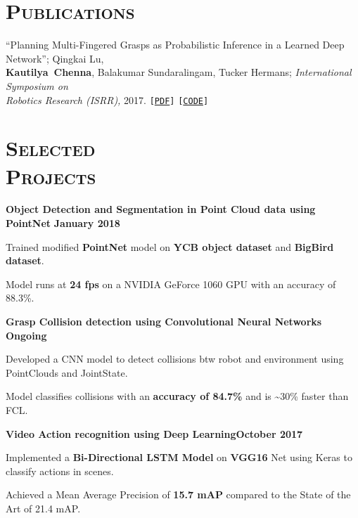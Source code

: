 \documentclass[margin, line]{resume}
\begin{document}
\begin{resume}

    \sectionline
    \section{\mysidestyle \textsc{Publications}}
     ``Planning Multi-Fingered Grasps as Probabilistic Inference in a Learned Deep Network''; Qingkai Lu,\\
     \mbox{\bf Kautilya Chenna}, Balakumar Sundaralingam, Tucker Hermans; \textit{International Symposium on\\ Robotics Research (ISRR),} 2017. \texttt{[\href{http://www.cs.utah.edu/~thermans/papers/lu-isrr2017-deep-multifinger-grasping.pdf}{PDF}]} \texttt{[\href{https://robot-learning.cs.utah.edu/project/grasp\_inference}{CODE}]}%



    \sectionline
    \section{\mysidestyle \textsc{Selected \\ Projects}}

    \textbf{Object Detection and Segmentation in Point Cloud data using PointNet} \hfill \textbf{January 2018}
    \begin{list2}
        \item Trained modified \textbf{PointNet} model on \textbf{YCB object dataset} and \textbf{BigBird dataset}.
        \item Model runs at \textbf{24 fps} on a NVIDIA GeForce 1060 GPU with an accuracy of 88.3\%.
    \end{list2}\vspace{-3.2mm}

    \textbf{Grasp Collision detection using Convolutional Neural Networks} \hfill \textbf{Ongoing}
    \begin{list2}
        \item Developed a CNN model to detect collisions btw robot and environment using PointClouds and JointState.
        \item Model classifies collisions with an \textbf{accuracy of 84.7\%} and is \textasciitilde 30\% faster than FCL.
    \end{list2}\vspace{-3.2mm}

    \textbf{Video Action recognition using Deep Learning}\hfill \textbf{October 2017}
    \begin{list2}
    \item Implemented a \textbf{Bi-Directional LSTM Model} on \textbf{VGG16} Net using Keras to classify actions in scenes.
    \item Achieved a Mean Average Precision of \textbf{15.7 mAP} compared to the State of the Art of 21.4 mAP.
    \end{list2}\vspace{-3.2mm}


\end{resume}
\end{document}
